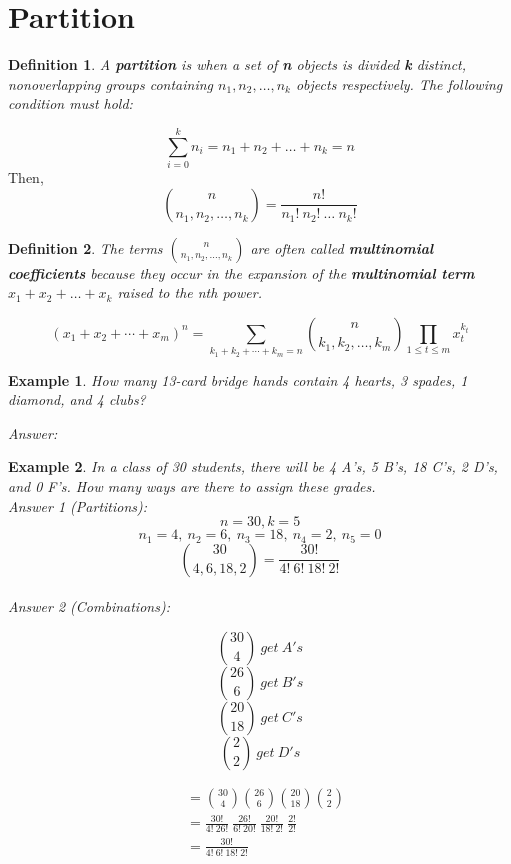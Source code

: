 \documentclass{article}
\newtheorem{defn}{Definition}
\newtheorem{ex}{Example}[defn]
\begin{document}
\section*{Partition}
\begin{defn}
A \textbf{partition} is when a set of \textbf{n} objects is divided \textbf{k} distinct, nonoverlapping groups containing $n_1,n_2, \ldots , n_k$ objects respectively. The following condition must hold:
\end{defn}
$${\displaystyle\sum\limits_{i=0}^k n_i}= n_1 + n_2 + \ldots + n_k = n$$
Then,
\begin{equation}
{n \choose n_1,n_2,\ldots,n_k} = \frac{n!}{n_1!\ n_2!\ \ldots\ n_k!}
\end{equation}

\newpage

\begin{defn}
The terms ${n \choose n_1,n_2,\ldots,n_k}$ are often called \textbf{multinomial coefficients} because they occur in the expansion of the \textbf{multinomial term} $x_1 + x_2 + \ldots + x_k$ raised to the nth power.
\end{defn}

\begin{equation}
(x_1 + x_2  + \cdots + x_m)^n = \sum_{k_1+k_2+\cdots+k_m=n} {n \choose k_1, k_2, \ldots, k_m} \prod_{1\leq t\leq m}x_{t}^{k_{t}}
\end{equation}

\begin{ex}
How many 13-card bridge hands contain 4 hearts, 3 spades, 1 diamond, and 4 clubs?

\indent \textit{Answer:} 
\end{ex}

\begin{ex}
In a class of 30 students, there will be 4 A's, 5 B's, 18 C's, 2 D's, and 0 F's. How many ways are there to assign these grades.\\
\indent \textit{Answer 1 (Partitions):} 
$$n = 30, k = 5$$
$$n_1 = 4,\ n_2 = 6,\ n_3 = 18,\ n_4 = 2,\ n_5 = 0$$
$${30 \choose 4,6,18,2} = \frac{30!}{4!\ 6!\ 18!\ 2!}$$
\\
\indent \textit{Answer 2 (Combinations):}
\begin{multicols}{2}
$${30 \choose 4}\ get\ A's$$
$${26 \choose 6}\ get\ B's$$
$${20 \choose 18}\ get\ C's$$
$${2 \choose 2}\ get\ D's$$

\vfill
\columnbreak
$$
\begin{aligned}
& ={30 \choose 4} {26 \choose 6} {20 \choose 18} {2 \choose 2}\\
& =\frac{30!}{4!\ 26!}\ \frac{26!}{6!\ 20!}\ \frac{20!}{18!\ 2!}\ \frac{2!}{2!}\\
& =\frac{30!}{4!\ 6!\ 18!\ 2!}\\
\end{aligned}
$$
\end{multicols}
\end{ex}
\end{document}
